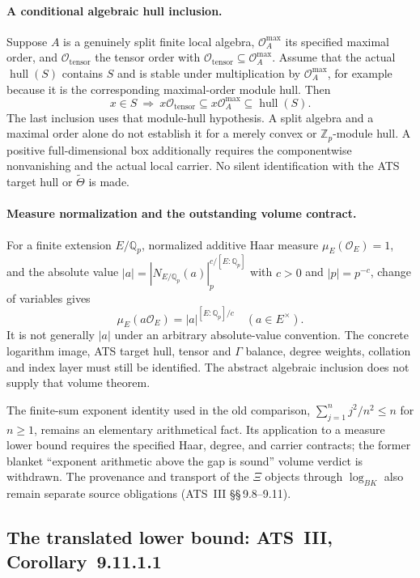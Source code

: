 \documentclass[11pt,a4paper]{article}
\theoremstyle{definition}
\theoremstyle{remark}
\begin{document}
\paragraph{A conditional algebraic hull inclusion.}
Suppose $A$ is a genuinely split finite local algebra, $\mathcal O_A^{\max}$
its specified maximal order, and $\mathcal O_{\mathrm{tensor}}$ the tensor
order with $\mathcal O_{\mathrm{tensor}}\subseteq\mathcal O_A^{\max}$.
Assume that the actual $\operatorname{hull}(S)$ contains $S$ and is stable
under multiplication by $\mathcal O_A^{\max}$, for example because it is
the corresponding maximal-order module hull. Then
\[
 x\in S\ \Longrightarrow\
 x\mathcal O_{\mathrm{tensor}}\subseteq
 x\mathcal O_A^{\max}\subseteq\operatorname{hull}(S).
\]
The last inclusion uses that module-hull hypothesis. A split algebra and
a maximal order alone do not establish it for a merely convex or
$\mathbb Z_p$-module hull. A positive full-dimensional box additionally
requires the componentwise nonvanishing and the actual local carrier.
No silent identification with the ATS target hull or $\widetilde\Theta$
is made.

\paragraph{Measure normalization and the outstanding volume contract.}
For a finite extension $E/\mathbb Q_p$, normalized additive Haar measure
$\mu_E(\mathcal O_E)=1$, and the absolute value
$|a|=|N_{E/\mathbb Q_p}(a)|_p^{c/[E:\mathbb Q_p]}$ with $c>0$ and
$|p|=p^{-c}$, change of variables gives
\[
 \mu_E(a\mathcal O_E)=|a|^{[E:\mathbb Q_p]/c}\quad(a\in E^\times).
\]
It is not generally $|a|$ under an arbitrary absolute-value convention.
The concrete logarithm image, ATS target hull, tensor and $\Gamma$ balance,
degree weights, collation and index layer must still be identified.
The abstract algebraic inclusion does not supply that volume theorem.

The finite-sum exponent identity used in the old comparison,
$\sum_{j=1}^{n}j^2/n^2\le n$ for $n\ge1$, remains an elementary
arithmetical fact. Its application to a measure lower bound requires the
specified Haar, degree, and carrier contracts; the former blanket
``exponent arithmetic above the gap is sound'' volume verdict is withdrawn.
The provenance and transport of the $\Xi$ objects through $\log_{BK}$
also remain separate source obligations (ATS~III \S\S\,9.8--9.11).

\subsection{The translated lower bound: ATS~III, Corollary~9.11.1.1}\label{sec:s7}
\end{document}
